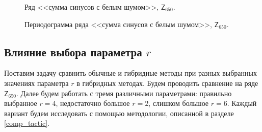 \documentclass[specialist,
               substylefile = spbu.rtx,
               subf,href,colorlinks=true, 12p]{disser}
\begin{document}
\begin{figure}[H]
	\captionsetup{justification=centering}
	\caption{Ряд <<сумма синусов с белым шумом>>, $\mathsf{Z}_{650}$.}
	\label{edsine_graph}
\end{figure}

\begin{figure}[H]
	\captionsetup{justification=centering}
	\caption{Периодограмма ряда <<сумма синусов с белым шумом>>, $\mathsf{Z}_{650}$.}
	\label{edsine_pgram}
\end{figure}

\subsection{Влияние выбора параметра $r$}
\label{edsinr}
Поставим задачу сравнить обычные и гибридные методы при разных выбранных значениях параметра $r$ в гибридных методах. Будем проводить сравнение на ряде $\mathsf{Z}_{650}$. Далее будем работать с тремя различными параметрами: правильно выбранное $r = 4$, недостаточно большое $r = 2$, слишком большое $r = 6$. Каждый вариант будем исследовать с помощью методологии, описанной в разделе \ref{comp_tactic}.
\end{document}
